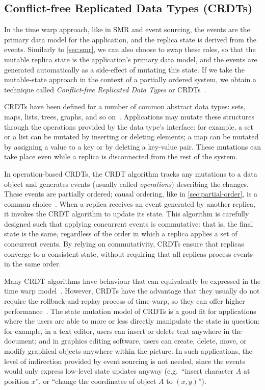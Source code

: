 \documentclass[sigconf]{acmart}
\begin{document}
\subsection{Conflict-free Replicated Data Types (CRDTs)}\label{sec:crdts}

In the time warp approach, like in SMR and event sourcing, the events are the primary data model for the application, and the replica state is derived from the events.
Similarly to \autoref{sec:smr}, we can also choose to swap these roles, so that the mutable replica state is the application's primary data model, and the events are generated automatically as a side-effect of mutating this state.
If we take the mutable-state approach in the context of a partially ordered system, we obtain a technique called \emph{Conflict-free Replicated Data Types} or CRDTs~\cite{Shapiro:2011}.

CRDTs have been defined for a number of common abstract data types: sets, maps, lists, trees, graphs, and so on~\cite{Shapiro:2011survey}.
Applications may mutate these structures through the operations provided by the data type's interface: for example, a set or a list can be mutated by inserting or deleting elements; a map can be mutated by assigning a value to a key or by deleting a key-value pair.
These mutations can take place even while a replica is disconnected from the rest of the system.

In operation-based CRDTs, the CRDT algorithm tracks any mutations to a data object and generates events (usually called \emph{operations}) describing the changes.
These events are partially ordered; causal ordering, like in \autoref{sec:partial-order}, is a common choice~\cite{Gomes:2017}.
When a replica receives an event generated by another replica, it invokes the CRDT algorithm to update its state.
This algorithm is carefully designed such that applying concurrent events is commutative: that is, the final state is the same, regardless of the order in which a replica applies a set of concurrent events.
By relying on commutativity, CRDTs ensure that replicas converge to a consistent state, without requiring that all replicas process events in the same order.

Many CRDT algorithms have behaviour that can equivalently be expressed in the time warp model~\cite{Kleppmann:2018}.
However, CRDTs have the advantage that they usually do not require the rollback-and-replay process of time warp, so they can offer higher performance~\cite{dePorre:2019}.
The state mutation model of CRDTs is a good fit for applications where the users are able to more or less directly manipulate the state in question: for example, in a text editor, users can insert or delete text anywhere in the document; and in graphics editing software, users can create, delete, move, or modify graphical objects anywhere within the picture.
In such applications, the level of indirection provided by event sourcing is not needed, since the events would only express low-level state updates anyway (e.g.\ ``insert character $A$ at position $x$'', or ``change the coordinates of object $A$ to $(x,y)$'').
\end{document}
